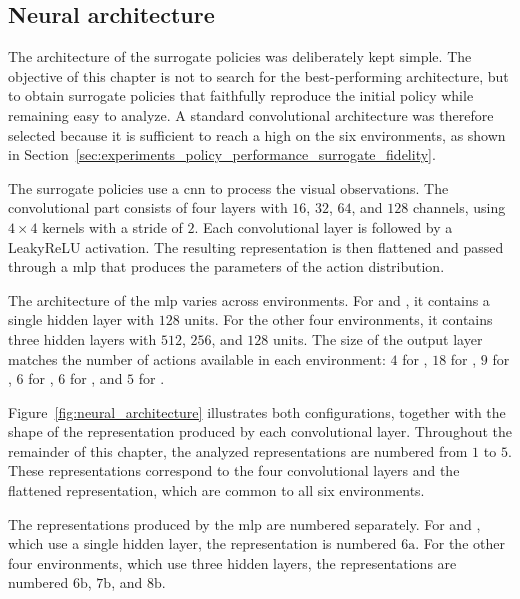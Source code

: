 \subsection{Neural architecture}

The architecture of the surrogate policies was deliberately kept simple.
The objective of this chapter is not to search for the best-performing architecture, but to obtain surrogate policies that faithfully reproduce the initial policy while remaining easy to analyze.
A standard convolutional architecture was therefore selected because it is sufficient to reach a high \BehaviorReconstructionName on the six environments, as shown in Section~\ref{sec:experiments_policy_performance_surrogate_fidelity}.

The surrogate policies use a \gls{cnn} to process the visual observations.
The convolutional part consists of four layers with $16$, $32$, $64$, and $128$ channels, using $4 \times 4$ kernels with a stride of $2$.
Each convolutional layer is followed by a LeakyReLU activation.
The resulting representation is then flattened and passed through a \gls{mlp} that produces the parameters of the action distribution.

The architecture of the \gls{mlp} varies across environments.
For \PongName and \SpaceInvadersName, it contains a single hidden layer with $128$ units.
For the other four environments, it contains three hidden layers with $512$, $256$, and $128$ units.
The size of the output layer matches the number of actions available in each environment: $4$ for \BreakoutName, $18$ for \MarioBrosName, $9$ for \MsPacManName, $6$ for \PongName, $6$ for \SpaceInvadersName, and $5$ for \SurroundName.

Figure~\ref{fig:neural_architecture} illustrates both configurations, together with the shape of the representation produced by each convolutional layer.
Throughout the remainder of this chapter, the analyzed representations are numbered from $1$ to $5$.
These representations correspond to the four convolutional layers and the flattened representation, which are common to all six environments.

The representations produced by the \gls{mlp} are numbered separately.
For \PongName and \SpaceInvadersName, which use a single hidden layer, the representation is numbered $6\text{a}$.
For the other four environments, which use three hidden layers, the representations are numbered $6\text{b}$, $7\text{b}$, and $8\text{b}$.




